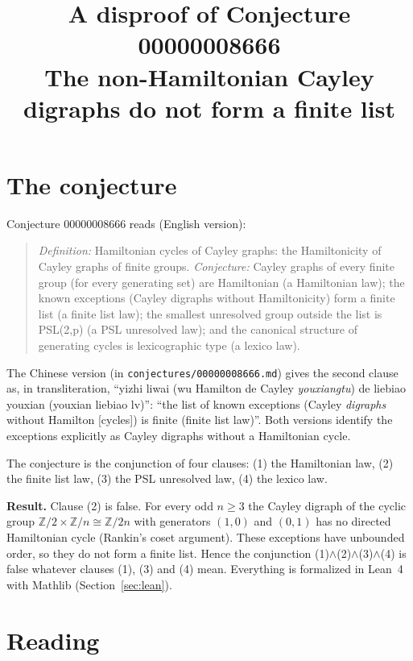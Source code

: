 \documentclass[11pt]{article}
\title{A disproof of Conjecture 00000008666\\[2pt]
\large The non-Hamiltonian Cayley digraphs do not form a finite list}
\date{}
\theoremstyle{definition}
\theoremstyle{remark}
\renewcommand{\_}{\oldus\allowbreak}
\newcommand{\Z}{\mathbb{Z}}
\begin{document}
\sloppy
\maketitle

\section{The conjecture}

Conjecture 00000008666 reads (English version):

\begin{quote}
\emph{Definition:} Hamiltonian cycles of Cayley graphs: the Hamiltonicity of Cayley graphs of finite
groups. \emph{Conjecture:} Cayley graphs of every finite group (for every generating set) are
Hamiltonian (a Hamiltonian law); the known exceptions (Cayley digraphs without Hamiltonicity) form a
finite list (a finite list law); the smallest unresolved group outside the list is PSL(2,p) (a PSL
unresolved law); and the canonical structure of generating cycles is lexicographic type (a lexico law).
\end{quote}

The Chinese version (in \texttt{conjectures/00000008666.md}) gives the second clause as, in
transliteration, ``yizhi liwai (wu Hamilton de Cayley \emph{youxiangtu}) de liebiao youxian
(youxian liebiao lv)'': ``the list of known exceptions (Cayley \emph{digraphs} without Hamilton
[cycles]) is finite (finite list law)''. Both versions identify the exceptions explicitly as Cayley
digraphs without a Hamiltonian cycle.

The conjecture is the conjunction of four clauses: (1) the Hamiltonian law, (2) the finite list law,
(3) the PSL unresolved law, (4) the lexico law.

\textbf{Result.} Clause (2) is false. For every odd $n \ge 3$ the Cayley digraph of the cyclic group
$\Z/2 \times \Z/n \cong \Z/2n$ with generators $(1,0)$ and $(0,1)$ has no directed Hamiltonian cycle
(Rankin's coset argument). These exceptions have unbounded order, so they do not form a finite list.
Hence the conjunction (1)$\wedge$(2)$\wedge$(3)$\wedge$(4) is false whatever clauses (1), (3) and (4)
mean. Everything is formalized in Lean~4 with Mathlib (Section~\ref{sec:lean}).

\section{Reading}\label{sec:reading}
\end{document}
